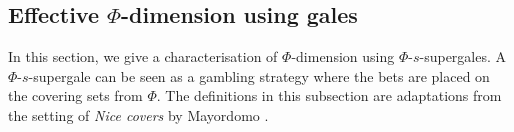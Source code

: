 \documentclass[11pt]{article}
\newcommand{\N}{\mathbb{N}}
\newcommand{\Q}{\mathbb{Q}}
\newcommand{\cdim}{\mathrm{cdim}}
\newcommand{\x}{x}
\begin{document}
%	
%	
%	
%	
%	
%	






\subsection{Effective $\Phi$-dimension using gales}

In this section, we give a characterisation of $\Phi$-dimension  using $\Phi$-$s$-supergales. A $\Phi$-$s$-supergale can be seen as a gambling strategy where the bets are placed on the covering sets from $\Phi$. The definitions in this subsection are adaptations from the setting of \emph{Nice covers} by Mayordomo \cite{Mayordomo2018}. 
\end{document}
